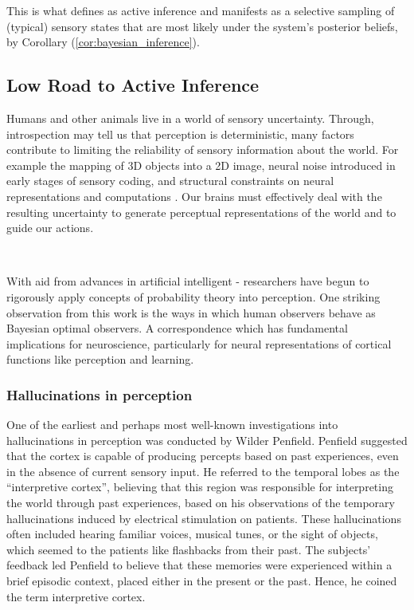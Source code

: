 \documentclass{article}
\newcommand{\refp}[1]{(\ref{#1})}
\begin{document}
This is what \citet{friston2012active} defines as active inference and manifests as a selective sampling of (typical) sensory states that are most likely under the system's posterior beliefs, by Corollary \refp{cor:bayesian_inference}.

\subsection{Low Road to Active Inference}

Humans and other animals live in a world of sensory uncertainty. Through, introspection may tell us that perception is deterministic, many factors contribute to limiting the reliability of sensory information about the world. For example the mapping of 3D objects into a 2D image, neural noise introduced in early stages of sensory coding, and structural constraints on neural representations and computations \citep{knill2004bayesian}. Our brains must effectively deal with the resulting uncertainty to generate perceptual representations of the world and to guide our actions.

\

With aid from advances in artificial intelligent - researchers have begun to rigorously apply concepts of probability theory into perception. \citep{knill2004bayesian} One striking observation from this work is the ways in which human observers behave as Bayesian optimal observers. A correspondence which has fundamental implications for neuroscience, particularly for neural representations of cortical functions like perception and learning. \citep{trommershauser2003statisticalb, trommershauser2003statisticala}

\subsubsection{Hallucinations in perception}

One of the earliest and perhaps most well-known investigations into hallucinations in perception was conducted by Wilder Penfield. \citep{penfield1961activation} Penfield suggested that the cortex is capable of producing percepts based on past experiences, even in the absence of current sensory input. He referred to the temporal lobes as the ``interpretive cortex'', believing that this region was responsible for interpreting the world through past experiences, based on his observations of the temporary hallucinations induced by electrical stimulation on patients. These hallucinations often included hearing familiar voices, musical tunes, or the sight of objects, which seemed to the patients like flashbacks from their past. The subjects' feedback led Penfield to believe that these memories were experienced within a brief episodic context, placed either in the present or the past. Hence, he coined the term interpretive cortex. \citep{knill2004bayesian}
\end{document}
